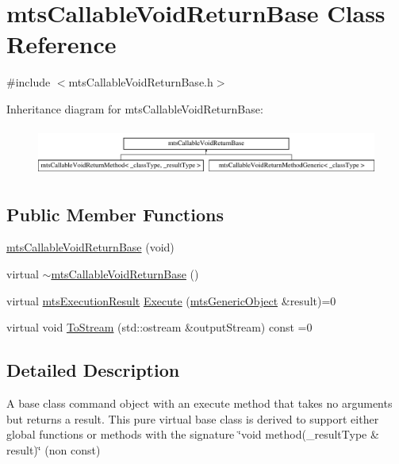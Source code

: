 \hypertarget{classmts_callable_void_return_base}{}\section{mts\+Callable\+Void\+Return\+Base Class Reference}
\label{classmts_callable_void_return_base}


{\ttfamily \#include $<$mts\+Callable\+Void\+Return\+Base.\+h$>$}

Inheritance diagram for mts\+Callable\+Void\+Return\+Base\+:\begin{figure}[H]
\begin{center}
\leavevmode
\includegraphics[height=1.590909cm]{d9/ddd/classmts_callable_void_return_base}
\end{center}
\end{figure}
\subsection*{Public Member Functions}
\begin{DoxyCompactItemize}
\item 
\hyperlink{classmts_callable_void_return_base_ac353432b81aacb59a0fa3707fa15fcfc}{mts\+Callable\+Void\+Return\+Base} (void)
\item 
virtual \hyperlink{classmts_callable_void_return_base_a528fa7ce7713010f7c054d5a346bd802}{$\sim$mts\+Callable\+Void\+Return\+Base} ()
\item 
virtual \hyperlink{classmts_execution_result}{mts\+Execution\+Result} \hyperlink{classmts_callable_void_return_base_a7f0fe84a7078bad40663aa86cd455fc2}{Execute} (\hyperlink{classmts_generic_object}{mts\+Generic\+Object} \&result)=0
\item 
virtual void \hyperlink{classmts_callable_void_return_base_ab5c0d1c688e1996c31260e95525f8f6d}{To\+Stream} (std\+::ostream \&output\+Stream) const =0
\end{DoxyCompactItemize}


\subsection{Detailed Description}
A base class command object with an execute method that takes no arguments but returns a result. This pure virtual base class is derived to support either global functions or methods with the signature \char`\"{}void method(\+\_\+result\+Type \& result)\char`\"{} (non const) 

